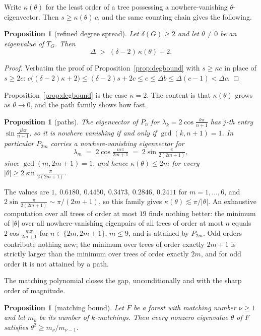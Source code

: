 \documentclass[11pt]{article}
\newtheorem{proposition}[theorem]{Proposition}
\theoremstyle{remark}
\begin{document}
Write $\kappa(\theta)$ for the least order of a tree possessing a nowhere-vanishing
$\theta$-eigenvector. Then $s\ge\kappa(\theta)\,c$, and the same counting chain gives the following.

\begin{proposition}[refined degree spread]\label{prop:degkappa}
Let $\delta(G)\ge2$ and let $\theta\ne0$ be an eigenvalue of $T_G$. Then
\[
  \Delta \;>\; (\delta-2)\,\kappa(\theta)+2 .
\]
\end{proposition}

\begin{proof}
Verbatim the proof of Proposition~\ref{prop:degbound} with $s\ge\kappa c$ in place of $s\ge2c$:
$c\big((\delta-2)\kappa+2\big)\le(\delta-2)s+2c\le e\le\Delta b\le\Delta(c-1)<\Delta c$.
\end{proof}

Proposition~\ref{prop:degbound} is the case $\kappa=2$. The content is that $\kappa(\theta)$ grows
as $\theta\to0$, and the path family shows how fast.

\begin{proposition}[paths]\label{prop:paths}
The eigenvector of $P_n$ for $\lambda_k=2\cos\frac{k\pi}{n+1}$ has $j$-th entry
$\sin\frac{jk\pi}{n+1}$, so it is nowhere vanishing if and only if $\gcd(k,n+1)=1$. In particular
$P_{2m}$ carries a nowhere-vanishing eigenvector for
\[
  \lambda_m \;=\; 2\cos\tfrac{m\pi}{2m+1} \;=\; 2\sin\tfrac{\pi}{2(2m+1)},
\]
since $\gcd(m,2m+1)=1$, and hence $\kappa(\theta)\le 2m$ for every $|\theta|\ge2\sin\frac{\pi}{2(2m+1)}$.
\end{proposition}

The values are $1,\ 0.6180,\ 0.4450,\ 0.3473,\ 0.2846,\ 0.2411$ for $m=1,\dots,6$, and
$2\sin\frac{\pi}{2(2m+1)}\sim\pi/(2m+1)$, so this family gives $\kappa(\theta)\lesssim\pi/|\theta|$.
An exhaustive computation over all trees of order at most $19$ finds nothing better: the minimum of
$|\theta|$ over all nowhere-vanishing eigenpairs of all trees of order at most $n$ equals
$2\cos\frac{m\pi}{2m+1}$ for $n\in\{2m,2m+1\}$, $m\le9$, and is attained by $P_{2m}$. Odd orders
contribute nothing new; the minimum over trees of order exactly $2m+1$ is strictly larger than the
minimum over trees of order exactly $2m$, and for odd order it is not attained by a path.

The matching polynomial closes the gap, unconditionally and with the sharp order of magnitude.

\begin{proposition}[matching bound]\label{prop:matchbound}
Let $F$ be a forest with matching number $\nu\ge1$ and let $m_k$ be its number of $k$-matchings.
Then every nonzero eigenvalue $\theta$ of $F$ satisfies $\theta^2\ge m_\nu/m_{\nu-1}$.
\end{proposition}
\end{document}
